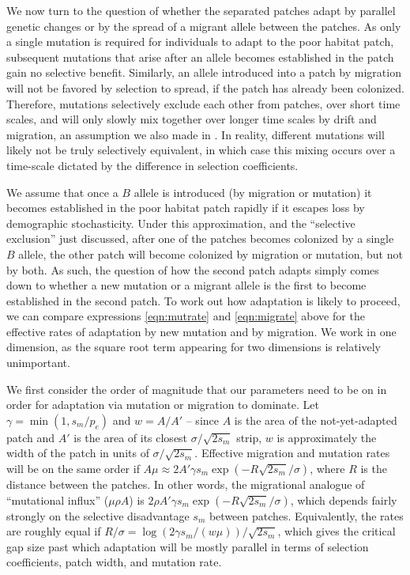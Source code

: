 \documentclass[10pt,letterpaper]{article}
\newcommand{\citep}[1]{\cite{#1}}
\begin{document}
We now turn to the question of whether the separated patches adapt by parallel genetic changes 
or by the spread of a migrant allele between the patches.
As only a single mutation is required for individuals to adapt to the
poor habitat patch, subsequent mutations that arise after an allele becomes established in the patch gain no selective benefit. 
Similarly, an allele introduced into a patch by migration will not be favored by selection to spread, 
if the patch has already been colonized. 
Therefore, mutations selectively exclude each other from patches, over short time scales, 
and will only slowly mix together over longer time scales by drift and migration,
an assumption we also made in \citep{ralph2010parallel}. 
In reality, different mutations will likely not be truly selectively equivalent,
in which case this mixing occurs over a time-scale dictated by the difference in selection coefficients.

We assume that once a $B$ allele is introduced (by migration or mutation) 
it becomes established in the poor habitat patch rapidly
if it escapes loss by demographic stochasticity.
Under this approximation, and the ``selective exclusion'' just discussed,
after one of the patches becomes colonized by a single $B$ allele, 
the other patch will become colonized by migration or mutation, but not by both. 
As such, the question of how the second patch adapts
simply comes down to whether a new mutation or a migrant allele is the first to become established in the second patch. 
To work out how adaptation is likely to proceed, 
we can compare expressions \eqref{eqn:mutrate} and \eqref{eqn:migrate} above
for the effective rates of adaptation by new mutation and by migration.
We work in one dimension, as the square root term appearing for two dimensions is relatively unimportant.

We first consider the order of magnitude that our parameters need to
be on in order for adaptation via mutation or migration to dominate.
Let $\gamma = \min(1,s_m/p_e)$
and $w = A/A'$ 
-- since $A$ is the area of the not-yet-adapted patch and $A'$ is the area of its closest $\sigma/\sqrt{2s_m}$ strip,
$w$ is approximately the width of the patch in units of $\sigma/\sqrt{2s_m}$.
Effective migration and mutation rates will be on the same order if 
$A \mu \approx 2 A' \gamma s_m \exp(- R \sqrt{2 s_m} / \sigma)$,
where $R$ is the distance between the patches.
In other words, the migrational analogue of ``mutational influx'' ($\mu \rho A$) 
is $2 \rho A' \gamma s_m \exp(- R \sqrt{2 s_m} / \sigma)$,
which depends fairly strongly on the selective disadvantage $s_m$ between patches.
Equivalently, the rates are roughly equal if
$R/\sigma = \log(2 \gamma s_m/(w \mu))/\sqrt{2s_m}$,
which gives the critical gap size past which adaptation will be mostly parallel
in terms of selection coefficients, patch width, and mutation rate.
\end{document}
